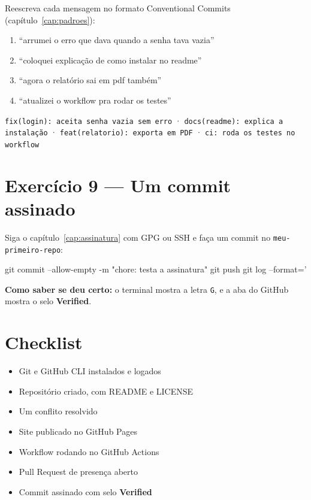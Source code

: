 Reescreva cada mensagem no formato Conventional Commits
(capítulo~\ref{cap:padroes}):

\begin{enumerate}
  \item \enquote{arrumei o erro que dava quando a senha tava vazia}
  \item \enquote{coloquei explicação de como instalar no readme}
  \item \enquote{agora o relatório sai em pdf também}
  \item \enquote{atualizei o workflow pra rodar os testes}
\end{enumerate}

\begin{dica}
\texttt{fix(login): aceita senha vazia sem erro} ·
\texttt{docs(readme): explica a instalação} ·
\texttt{feat(relatorio): exporta em PDF} ·
\texttt{ci: roda os testes no workflow}
\end{dica}

\section{Exercício 9 — Um commit assinado}

Siga o capítulo~\ref{cap:assinatura} com GPG ou SSH e faça um commit no
\texttt{meu-primeiro-repo}:

\begin{bashcode}
git commit --allow-empty -m "chore: testa a assinatura"
git push
git log --format='%
\end{bashcode}

\textbf{Como saber se deu certo:} o terminal mostra a letra \texttt{G}, e a
aba  do GitHub mostra o selo \textbf{Verified}.

\section{Checklist}

\begin{itemize}
  \item[$\square$] Git e GitHub CLI instalados e logados
  \item[$\square$] Repositório criado, com README e LICENSE
  \item[$\square$] Um conflito resolvido
  \item[$\square$] Site publicado no GitHub Pages
  \item[$\square$] Workflow rodando no GitHub Actions
  \item[$\square$] Pull Request de presença aberto
  \item[$\square$] Commit assinado com selo \textbf{Verified}
\end{itemize}
